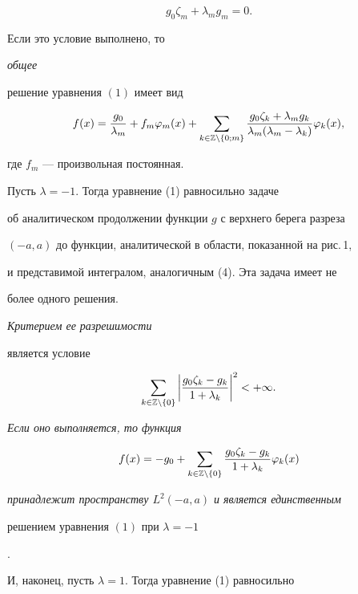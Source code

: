 $$


g_{0}\zeta_{m}+\lambda_{m}g_{m}=0.


$$


Если это условие выполнено, то {\it общее


решение уравнения $(1)$ имеет вид}


$$


f(x)=\dfrac{g_{0}}{\lambda_{m}}+f_{m}\varphi_{m}(x)+


\sum_{k\in \Bbb{Z}\setminus\{0;m\}}


 \dfrac{g_{0}\zeta_{k}+\lambda_{m}g_{k}}


{\lambda_{m}(\lambda_{m}-\lambda_{k})}


\varphi_{k}(x),


$$


где $f_{m}$ --- произвольная постоянная.





Пусть $\lambda=-1$. Тогда уравнение (1) равносильно задаче


об аналитическом продолжении функции $g$ с верхнего берега разреза


$(-a,a)$ до функции, аналитической в области, показанной на рис.\,1,


и представимой интегралом, аналогичным (4). Эта задача имеет не


более одного решения. {\it Критерием ее разрешимости


является условие}


\begin{equation}


\sum_{k\in \Bbb{Z}\setminus\{0\}}\bigg|\dfrac{g_{0}


\zeta_{k}-g_{k}}{1+\lambda_{k}}\bigg|^{2}<+\infty.


\end{equation}


{\it Если оно выполняется, то функция}


$$


f(x)=-g_{0}+\sum_{k\in \Bbb{Z}\setminus\{0\}}


\dfrac{g_{0}\zeta_{k}-g_{k}}{1+\lambda_{k}}\varphi_{k}(x)


$$


{\it принадлежит пространству $L^{2}(-a,a)$ и является единственным


решением уравнения $(1)$ при $\lambda=-1$}.





И, наконец, пусть $\lambda=1$. Тогда уравнение (1) равносильно



